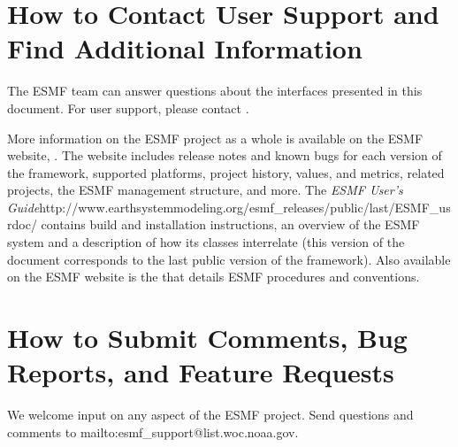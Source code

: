 \section{How to Contact User Support and Find Additional Information}
\label{sec:Support}
The ESMF team can answer questions about the interfaces presented in this 
document.  For user support, please contact 
.  

More information on the ESMF project as a whole is available on the 
ESMF website, 
\linebreak
{}.  
The website includes release notes and known bugs for each version of the
framework, supported platforms, project history, values, and metrics, related projects,
the ESMF management structure, and more.  The \htmladdnormallink
{{\it ESMF User's Guide}}{http://www.earthsystemmodeling.org/esmf\_releases/public/last/ESMF\_usrdoc/} contains build and installation instructions, an overview of the ESMF system and a description of 
how its classes interrelate (this version of the document corresponds to the last public version of the framework).  Also available on the ESMF website is the 
that details ESMF procedures and conventions.  
 
\section{How to Submit Comments, Bug Reports, and Feature Requests}
\label{sec:Submission}
We welcome input on any aspect of the ESMF project.  Send
questions and comments to 
\newline
{}
{mailto:esmf\_support@list.woc.noaa.gov}.






